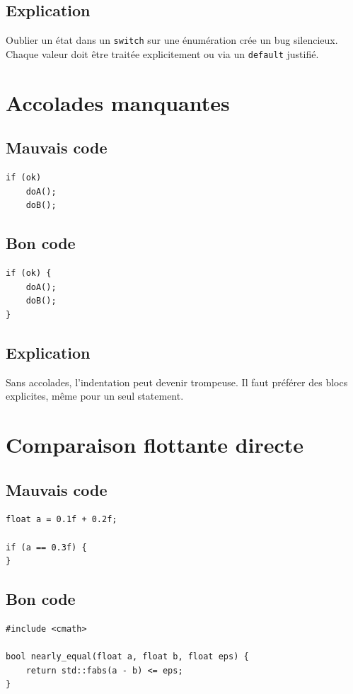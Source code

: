 \documentclass[a4paper,11pt]{report}
\begin{document}
\section{Explication}
Oublier un état dans un \texttt{switch} sur une énumération crée un bug silencieux.
Chaque valeur doit être traitée explicitement ou via un \texttt{default} justifié.

\chapter{Accolades manquantes}

\section{Mauvais code}
\begin{lstlisting}
if (ok)
    doA();
    doB();
\end{lstlisting}

\section{Bon code}
\begin{lstlisting}
if (ok) {
    doA();
    doB();
}
\end{lstlisting}

\section{Explication}
Sans accolades, l'indentation peut devenir trompeuse.
Il faut préférer des blocs explicites, même pour un seul statement.

\chapter{Comparaison flottante directe}

\section{Mauvais code}
\begin{lstlisting}
float a = 0.1f + 0.2f;

if (a == 0.3f) {
}
\end{lstlisting}

\section{Bon code}
\begin{lstlisting}
#include <cmath>

bool nearly_equal(float a, float b, float eps) {
    return std::fabs(a - b) <= eps;
}
\end{lstlisting}
\end{document}
